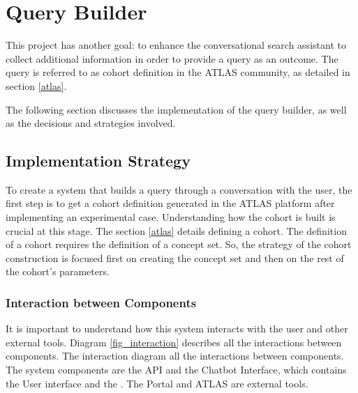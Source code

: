\chapter{Query Builder}
\label{chapter:QueryBuilder}

This project has another goal: to enhance the conversational search assistant to collect additional information in order to provide a query as an outcome. The query is referred to as cohort definition in the ATLAS community, as detailed in section \ref{atlas}.

The following section discusses the implementation of the query builder, as well as the decisions and strategies involved.


\section{Implementation Strategy}


To create a system that builds a query through a conversation with the user, the first step is to get a cohort definition generated in the ATLAS platform after implementing an experimental case. Understanding how the cohort is built is crucial at this stage. The section \ref{atlas} details defining a cohort. The definition of a cohort requires the definition of a concept set. So, the strategy of the cohort construction is focused first on creating the concept set and then on the rest of the cohort's parameters.


\subsection{Interaction between Components}

It is important to understand how this system interacts with the user and other external tools. Diagram \ref{fig_interaction} describes all the interactions between components. The interaction diagram all the interactions between components. The system components are the {\ir} API and the Chatbot Interface, which contains the User interface and the {\llm}. The {\ehden} Portal and ATLAS are external tools.

